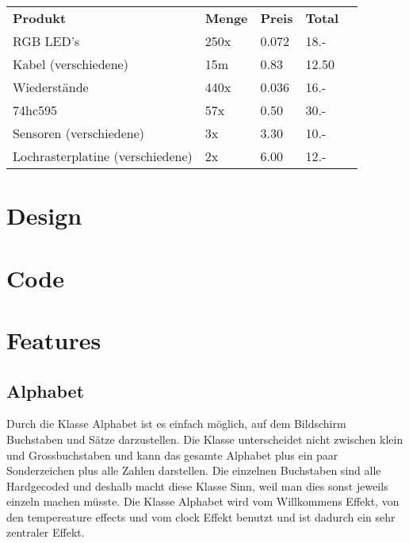 \documentclass[12pt,a4paper]{article}
\begin{document}
\begin{tabularx}{\textwidth}{p{} | l | l | l | r |}
    \textbf{Produkt} & \textbf{Menge} & \textbf{Preis} & \textbf{Total} \\
    \cline{1-4}
    RGB LED's & 250x & 0.072 & 18.- \\
    \cline{1-4}
    Kabel (verschiedene) & 15m & 0.83 & 12.50 \\
    \cline{1-4}
    Wiederstände & 440x & 0.036 & 16.- \\
    \cline{1-4}
    74hc595 & 57x & 0.50 & 30.- \\   
    \cline{1-4}
    Sensoren (verschiedene) & 3x & 3.30 & 10.- \\
    \cline{1-4}
	Lochrasterplatine (verschiedene) & 2x & 6.00 & 12.- \\
    
\end{tabularx}

\section{Design}

\subsection{}

\section{Code}

\subsection{}

\section{Features}

\subsection{Alphabet}

Durch die Klasse Alphabet ist es einfach möglich, auf dem Bildschirm Buchstaben und Sätze darzustellen. Die Klasse unterscheidet nicht zwischen klein und Grossbuchstaben und kann das gesamte Alphabet plus ein paar Sonderzeichen plus alle Zahlen darstellen. Die einzelnen Buchstaben sind alle Hardgecoded und deshalb macht diese Klasse Sinn, weil man dies sonst jeweils einzeln machen müsste. Die Klasse Alphabet wird vom Willkommens Effekt, von den tempereature effects und vom clock Effekt benutzt und ist dadurch ein sehr zentraler Effekt.
\end{document}
